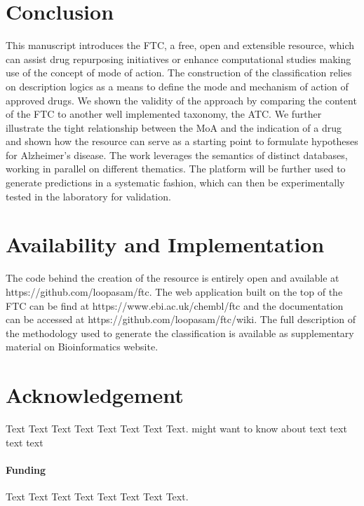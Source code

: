 \documentclass{bioinfo}
\begin{document}
\section{Conclusion}
This manuscript introduces the FTC, a free, open and extensible resource, which can assist drug repurposing 
initiatives or enhance computational studies making use of the concept of mode of action. The construction of 
the classification relies on description logics as a means to define the mode and mechanism of action of approved 
drugs. We shown the validity of the approach by comparing the content of the FTC to another well implemented taxonomy, 
the ATC. We further illustrate the tight relationship between the MoA and the indication of a drug and shown how the 
resource can serve as a starting point to formulate hypotheses for Alzheimer's disease. The work leverages the 
semantics of distinct databases, working in parallel on different thematics. The platform will be further used 
to generate predictions in a systematic fashion, which can then be experimentally tested in the laboratory for validation.

\section{Availability and Implementation}
The code behind the creation of the resource is entirely open and available 
at {{https://github.com/loopasam/ftc}}. The web application built on the top of the FTC can be 
find at {{https://www.ebi.ac.uk/chembl/ftc}} and the documentation can be accessed at {{https://github.com/loopasam/ftc/wiki}}. The full
description of the methodology used to generate the classification is available as supplementary material on Bioinformatics website.

\section*{Acknowledgement}
Text Text Text Text Text Text  Text Text.  \citealp{Boffelli03} might want to know about  text text text text

\paragraph{Funding\textcolon} Text Text Text Text Text Text  Text Text.

%
%
%
%
%
%
%
%
%
\end{document}
